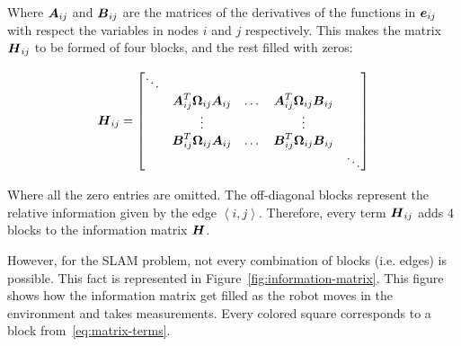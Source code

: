 Where $\boldsymbol{A}_{ij}$ and $\boldsymbol{B}_{ij}$ are the matrices of the derivatives of the functions in $\boldsymbol{e}_{ij}$ with respect the variables in nodes $i$ and $j$ respectively. This makes the matrix $\boldsymbol{H}_{ij}$ to be formed of four blocks, and the rest filled with zeros:

\begin{equation}
\boldsymbol{H}_{ij} = \begin{bmatrix}
\ddots & & & & \\
& \boldsymbol{A}_{ij}^T \boldsymbol{\Omega}_{ij}\boldsymbol{A}_{ij} & \dots & 
\boldsymbol{A}_{ij}^T \boldsymbol{\Omega}_{ij}\boldsymbol{B}_{ij} & \\
& \vdots & & \vdots & \\
& \boldsymbol{B}_{ij}^T \boldsymbol{\Omega}_{ij}\boldsymbol{A}_{ij} & \dots & 
\boldsymbol{B}_{ij}^T \boldsymbol{\Omega}_{ij}\boldsymbol{B}_{ij} & \\
& & & & \ddots
\end{bmatrix}
\label{eq:matrix-terms}
\end{equation}

Where all the zero entries are omitted. The off-diagonal blocks represent the relative information given by the edge $\left\langle i,j\right\rangle$. Therefore, every term $\boldsymbol{H}_{ij}$ adds 4 blocks to the information matrix $\boldsymbol{H}$.

However, for the SLAM problem, not every combination of blocks (i.e. edges) is possible. This fact is represented in Figure~\ref{fig:information-matrix}. This figure shows how the information matrix get filled as the robot moves in the environment and takes measurements. Every colored square corresponds to a block from~\eqref{eq:matrix-terms}. 

